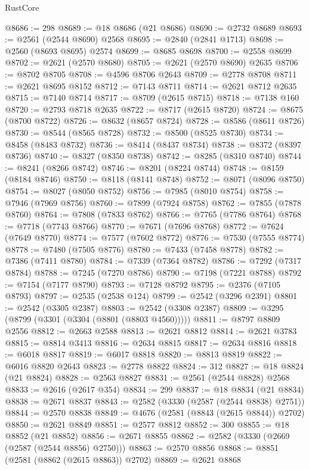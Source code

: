 \begin{lexlean}{RustCore}
\begin{coremodule}
@8686 := 298
@8689 := @18 @8686 (@21 @8686)
@8690 := @2732 @8689
@8693 := @2561 (@2544 @8690) @2568
@8695 := @2840 (@2841 @1713)
@8698 := @2560 (@8693 @8695) @2574
@8699 := @8685 @8698
@8700 := @2558 @8699
@8702 := @2621 (@2570 @8680)
@8705 := @2621 (@2570 @8690) @2635
@8706 := @8702 @8705
@8708 := @4596 @8706 @2643
@8709 := @2778 @8708
@8711 := @2621 @8695 @8152
@8712 := @7143 @8711
@8714 := @2621 @8712 @2635
@8715 := @7140 @8714
@8717 := @8709 (@2615 @8715)
@8718 := @7138 @160
@8720 := @2793 @8718 @2635
@8722 := @8717 (@2615 @8720)
@8724 := @8675 (@8700 @8722)
@8726 := @8632 (@8657 @8724)
@8728 := @8586 (@8611 @8726)
@8730 := @8544 (@8565 @8728)
@8732 := @8500 (@8525 @8730)
@8734 := @8458 (@8483 @8732)
@8736 := @8414 (@8437 @8734)
@8738 := @8372 (@8397 @8736)
@8740 := @8327 (@8350 @8738)
@8742 := @8285 (@8310 @8740)
@8744 := @8241 (@8266 @8742)
@8746 := @8201 (@8224 @8744)
@8748 := @8159 (@8184 @8746)
@8750 := @8118 (@8141 @8748)
@8752 := @8071 (@8096 @8750)
@8754 := @8027 (@8050 @8752)
@8756 := @7985 (@8010 @8754)
@8758 := @7946 (@7969 @8756)
@8760 := @7899 (@7924 @8758)
@8762 := @7855 (@7878 @8760)
@8764 := @7808 (@7833 @8762)
@8766 := @7765 (@7786 @8764)
@8768 := @7718 (@7743 @8766)
@8770 := @7671 (@7696 @8768)
@8772 := @7624 (@7649 @8770)
@8774 := @7577 (@7602 @8772)
@8776 := @7530 (@7555 @8774)
@8778 := @7480 (@7505 @8776)
@8780 := @7433 (@7458 @8778)
@8782 := @7386 (@7411 @8780)
@8784 := @7339 (@7364 @8782)
@8786 := @7292 (@7317 @8784)
@8788 := @7245 (@7270 @8786)
@8790 := @7198 (@7221 @8788)
@8792 := @7154 (@7177 @8790)
@8793 := @7128 @8792
@8795 := @2376 (@7105 @8793)
@8797 := @2535 (@2538 @124)
@8799 := @2542 (@3296 @2391)
@8801 := @2542 (@3305 @2387)
@8803 := @2542 (@3308 @2387)
@8809 := @3295 (@8799 (@3301 (@3304 (@8801 (@8803 @4560)))))
@8811 := @8797 @8809 @2556
@8812 := @2663 @2588
@8813 := @2621 @8812
@8814 := @2621 @3783
@8815 := @8814 @3413
@8816 := @2634 @8815
@8817 := @2634 @8816
@8818 := @6018 @8817
@8819 := @6017 @8818
@8820 := @8813 @8819
@8822 := @6016 @8820 @2643
@8823 := @2778 @8822
@8824 := 312
@8827 := @18 @8824 (@21 @8824)
@8828 := @2563 @8827
@8831 := @2561 (@2544 @8828) @2568
@8833 := @2616 (@2617 @354)
@8834 := 299
@8837 := @18 @8834 (@21 @8834)
@8838 := @2671 @8837
@8843 := @2582 (@3330 (@2587 (@2544 @8838) @2751))
@8844 := @2570 @8838
@8849 := @4676 (@2581 (@8843 (@2615 @8844)) @2702)
@8850 := @2621 @8849
@8851 := @2577 @8812
@8852 := 300
@8855 := @18 @8852 (@21 @8852)
@8856 := @2671 @8855
@8862 := @2582 (@3330 (@2669 (@2587 (@2544 @8856) @2750)))
@8863 := @2570 @8856
@8868 := @8851 (@2581 (@8862 (@2615 @8863)) @2702)
@8869 := @2621 @8868

\end{coremodule}
\end{lexlean}
